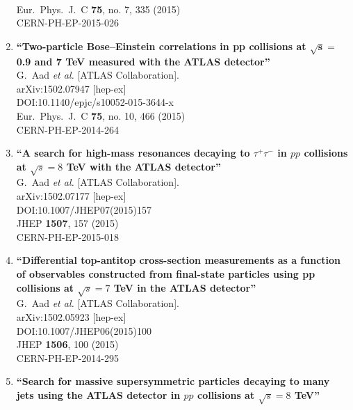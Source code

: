 \documentclass{article}
\begin{document}
\begin{enumerate}
  \\{}Eur.\ Phys.\ J.\ C {\bf 75}, no. 7, 335 (2015)
  \\{}CERN-PH-EP-2015-026
\item%
{\bf ``Two-particle Bose–Einstein correlations in pp collisions at $\mathbf {\sqrt{s} =}$ 0.9 and 7 TeV measured with the ATLAS detector''}
  \\{}G.~Aad {\it et al.} [ATLAS Collaboration].
  \\{}arXiv:1502.07947 [hep-ex]
  \\{}DOI:10.1140/epjc/s10052-015-3644-x
  \\{}Eur.\ Phys.\ J.\ C {\bf 75}, no. 10, 466 (2015)
  \\{}CERN-PH-EP-2014-264
\item%
{\bf ``A search for high-mass resonances decaying to $\tau^{+}\tau^{-}$ in $pp$ collisions at $\sqrt{s}=8$ TeV with the ATLAS detector''}
  \\{}G.~Aad {\it et al.} [ATLAS Collaboration].
  \\{}arXiv:1502.07177 [hep-ex]
  \\{}DOI:10.1007/JHEP07(2015)157
  \\{}JHEP {\bf 1507}, 157 (2015)
  \\{}CERN-PH-EP-2015-018
\item%
{\bf ``Differential top-antitop cross-section measurements as a function of observables constructed from final-state particles using pp collisions at $\sqrt{s}=7$ TeV in the ATLAS detector''}
  \\{}G.~Aad {\it et al.} [ATLAS Collaboration].
  \\{}arXiv:1502.05923 [hep-ex]
  \\{}DOI:10.1007/JHEP06(2015)100
  \\{}JHEP {\bf 1506}, 100 (2015)
  \\{}CERN-PH-EP-2014-295
\item%
{\bf ``Search for massive supersymmetric particles decaying to many jets using the ATLAS detector in $pp$ collisions at $\sqrt{s} = 8$ TeV''}

\end{enumerate}
\end{document}
